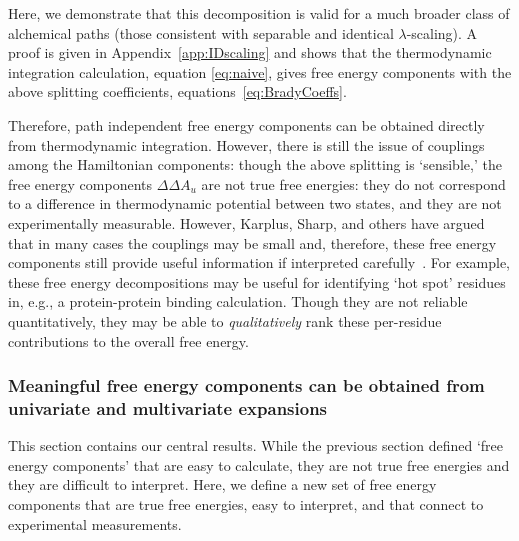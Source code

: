 \documentclass{article}
\begin{document}
Here, we demonstrate that this decomposition is valid for a much broader class of alchemical paths (those consistent with separable and identical $\lambda$-scaling).  A proof is given in Appendix~\ref{app:IDscaling} and shows that the thermodynamic integration calculation, equation \ref{eq:naive}, gives free energy components with the above splitting coefficients, equations~\ref{eq:BradyCoeffs}. 

Therefore, path independent free energy components can be obtained directly from thermodynamic integration. However, there is still the issue of couplings among the Hamiltonian components: though the above splitting is `sensible,' the free energy components $\Delta \Delta A_u$ are not true free energies: they do not correspond to a difference in thermodynamic potential between two states, and they are not experimentally measurable. However, Karplus, Sharp, and others have argued that in many cases the couplings may be small and, therefore, these free energy components still provide useful information if interpreted carefully~\cite{Boresch:1994jj,Brady:1995dz,Boresch:1995ux,Archontis:1996ef}. For example, these free energy decompositions may be useful for identifying `hot spot' residues in, e.g., a protein-protein binding calculation.  Though they are not reliable quantitatively, they may be able to \textit{qualitatively} rank these per-residue contributions to the overall free energy.  

\subsubsection{Meaningful free energy components can be obtained from univariate and multivariate expansions}

This section contains our central results. While the previous section defined `free energy components' that are easy to calculate, they are not true free energies and they are difficult to interpret. Here, we define a new set of free energy components that are true free energies, easy to interpret, and that connect to experimental measurements.   
\end{document}
